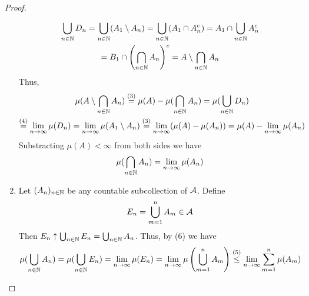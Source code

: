 \begin{proof}
\begin{enumerate}
		\begin{multline*}
		\bigcup_{n\in\mathbb{N}} D_n = \bigcup_{n \in \mathbb{N}} (A_1\setminus A_n) = \bigcup_{n \in \mathbb{N}} (A_1\cap A_n^c) = A_1 \cap \bigcup_{n \in \mathbb{N}} A_n^c \\
		= B_1 \cap \left(\bigcap_{n \in \mathbb{N}} A_n\right)^c = A \setminus \bigcap_{n\in\mathbb{N}} A_n
		\end{multline*}
		Thus,
		\begin{multline*}
		\mu(A \setminus \bigcap_{n\in\mathbb{N}} A_n) \overset{(3)}{=} \mu(A) - \mu(\bigcap_{n\in\mathbb{N}} A_n) = \mu(\bigcup_{n \in \mathbb{N}} D_n) \\
		\overset{(4)}{=} \lim_{n\to \infty}\mu(D_n) = \lim_{n\to \infty} \mu(A_1 \setminus A_n) \overset{(3)}{=} \lim_{n\to \infty} (\mu(A) - \mu(A_n)) = \mu(A) - \lim_{n\to \infty} \mu(A_n)
		\end{multline*}
		Substracting $\mu(A) <\infty$ from both sides we have
		\begin{align*}
		\mu(\bigcap_{n \in \mathbb{N}} A_n) = \lim_{n\to \infty} \mu(A_n)
		\end{align*}
		\item Let $(A_n)_{n\in\mathbb{N}}$ be any countable subcollection of $\mathcal{A}$. Define
		\begin{align*}
		E_n = \bigcup_{m = 1}^n A_m \in \mathcal{A}
		\end{align*}
		Then $E_n \uparrow \bigcup_{n\in\mathbb{N}} E_n = \bigcup_{n\in\mathbb{N}} A_n$. Thus, by (6) we have
		\begin{align*}
		\mu(\bigcup_{n\in\mathbb{N}} A_n) = \mu(\bigcup_{n\in\mathbb{N}} E_n) = \lim_{n\to \infty} \mu(E_n) = \lim_{n\to \infty} \mu\left(\bigcup_{m = 1}^n A_m\right) \overset{(5)}{\leq}\lim_{n\to \infty} \sum_{m=1}^{n}\mu(A_m)
		\end{align*}
	\end{enumerate}
\end{proof}

